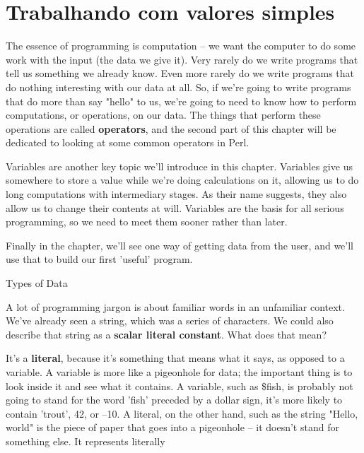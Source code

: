 \documentclass[a4paper,11pt]{book}
\begin{document}

\chapter{Trabalhando com valores simples}

\noindent The essence of programming is computation -- we want the computer to do some work with the input (the data we give it). Very rarely do we write programs that tell us something we already know. Even more rarely do we write programs that do nothing interesting with our data at all. So, if we're going to write programs that do more than say "hello" to us, we're going to need to know how to perform computations, or operations, on our data. The things that perform these operations are called \textbf{operators}, and the second part of this chapter will be dedicated to looking at some common operators in Perl.

\noindent 

\noindent Variables are another key topic we'll introduce in this chapter. Variables give us somewhere to store a value while we're doing calculations on it, allowing us to do long computations with intermediary stages. As their name suggests, they also allow us to change their contents at will. Variables are the basis for all serious programming, so we need to meet them sooner rather than later.

\noindent 

\noindent Finally in the chapter, we'll see one way of getting data from the user, and we'll use that to build our first 'useful' program.

\noindent 

\noindent 

\noindent Types of Data

\noindent 

\noindent A lot of programming jargon is about familiar words in an unfamiliar context. We've already seen a string, which was a series of characters. We could also describe that string as a \textbf{scalar literal constant}. What does that mean?

\noindent 

\noindent It's a \textbf{literal}, because it's something that means what it says, as opposed to a variable. A variable is more like a pigeonhole for data; the important thing is to look inside it and see what it contains. A variable, such as \$fish, is probably not going to stand for the word 'fish' preceded by a dollar sign, it's more likely to contain 'trout', 42, or --10. A literal, on the other hand, such as the string "Hello, world" is the piece of paper that goes into a pigeonhole -- it doesn't stand for something else. It represents literally
\end{document}
